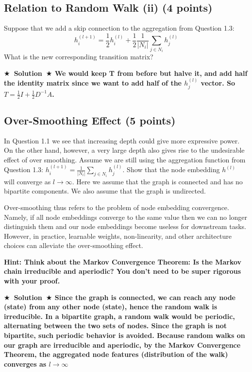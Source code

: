 \documentclass{article}
\numberwithin{figure}{section}
\newcommand{\Solution}[1]{{\medskip \color{red} \bf $\bigstar$~\sf \textbf{Solution}~$\bigstar$ \sf #1 } \bigskip}
\begin{document}
\subsection{Relation to Random Walk (ii) (4 points)}

Suppose that we add a skip connection to the aggregation from Question 1.3:
$$h^{(l+1)}_i = \frac{1}{2}h^{(l)}_i + \frac{1}{2}\frac{1}{|N_i|} \sum_{j \in N_i} h^{(l)}_j$$
What is the new corresponding transition matrix?

\Solution{We would keep T from before but halve it, and add half the identity matrix since we want to add half of the $h^{(l)}_j$ vector. So $T = \frac{1}{2}I + \frac{1}{2}D^{-1}A$.}


\subsection{Over-Smoothing Effect (5 points)}

In Question 1.1 we see that increasing depth could give more expressive power.
On the other hand, however, a very large depth also gives rise to the undesirable
effect of over smoothing. Assume we are still using the aggregation function
from Question 1.3: $h^{(l+1)}_i = \frac{1}{|N_i|} \sum_{j \in N_i} h^{(l)}_j$. Show that the node embedding $h^{(l)}$ will converge as $l \rightarrow \infty$. Here we assume that the graph is connected and has no bipartite components. We also assume that the graph is undirected.

Over-smoothing thus refers to the problem of node embedding convergence. Namely, if all node embeddings converge to the same value then we can no longer distinguish them and our node embeddings become useless for downstream tasks. However, in practice, learnable weights, non-linearity, and other architecture choices can alleviate the over-smoothing effect.

\textbf{Hint: Think about the Markov Convergence Theorem: Is the Markov chain irreducible and aperiodic? You don’t need to be super rigorous with your proof.}

\Solution{Since the graph is connected, we can reach any node (state) from any other node (state), hence the random walk is irreducible.
In a bipartite graph, a random walk would be periodic, alternating between the two sets of nodes. Since the graph is not bipartite, such periodic behavior is avoided.
Because random walks on our graph are irreducible and aperiodic, by the Markov Convergence Theorem, the aggregated node features (distribution of the walk) converges as $l \rightarrow \infty$}
\end{document}
